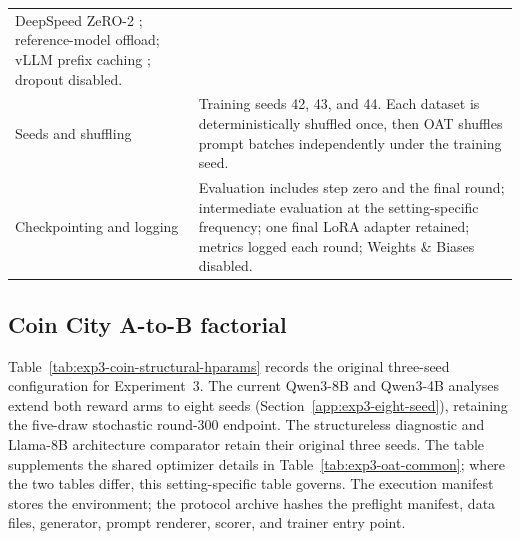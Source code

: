 \begin{center}
\begin{minipage}{\linewidth}
\begin{tabular}{p{.29\linewidth}p{.66\linewidth}}
DeepSpeed ZeRO-2 \citep{rajbhandari2020zero}; reference-model offload; vLLM prefix
caching \citep{kwon2023vllm}; dropout disabled. \\
Seeds and shuffling & Training seeds 42, 43, and 44.  Each dataset is deterministically
shuffled once, then OAT shuffles prompt batches independently under the training seed. \\
Checkpointing and logging & Evaluation includes step zero and the final round;
intermediate evaluation at the setting-specific frequency; one final LoRA adapter retained; metrics
logged each round; Weights \& Biases disabled. \\
\bottomrule
\end{tabular}
\end{minipage}
\end{center}


\subsection{Coin City A-to-B factorial}
\label{app:exp3-coin-structural-hparams}

Table~\ref{tab:exp3-coin-structural-hparams} records the original three-seed
configuration for Experiment~3. The current Qwen3-8B and Qwen3-4B analyses extend
both reward arms to eight seeds (Section~\ref{app:exp3-eight-seed}), retaining
the five-draw stochastic round-300 endpoint. The structureless diagnostic and
Llama-8B architecture comparator retain their original three seeds. The
table supplements the shared optimizer details in Table~\ref{tab:exp3-oat-common}; where the two tables differ, this
setting-specific table governs. The execution manifest stores the environment;
the protocol archive hashes the preflight manifest, data files,
generator, prompt renderer, scorer, and trainer entry point.

